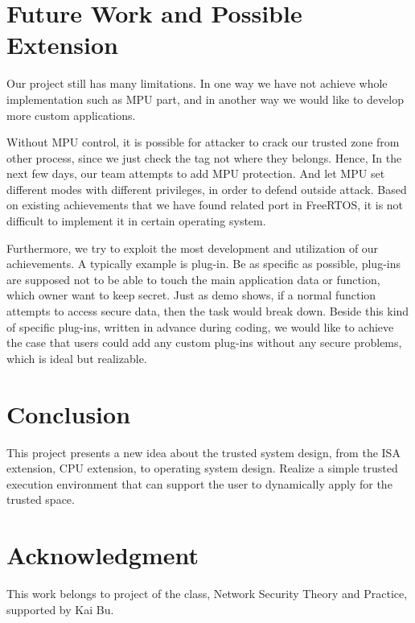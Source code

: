 \documentclass[conference]{IEEEtran}
\begin{document}

\section{Future Work and Possible Extension}
Our project still has many limitations. In one way we have not achieve whole implementation such as MPU part, and in another way we would like to develop more custom applications. 

Without MPU control, it is possible for attacker to crack our trusted zone from other process, since we just check the tag not where they belongs. Hence, In the next few days, our team attempts to add MPU protection. And let MPU set different modes with different privileges, in order to defend outside attack. Based on existing achievements that we have found related port in FreeRTOS, it is not difficult to implement it in certain operating system.


Furthermore, we try to exploit the most development and utilization of our achievements. A typically example is plug-in. Be as specific as possible, plug-ins are supposed not to be able to touch the main application data or function, which owner want to keep secret. Just as demo shows, if a normal function attempts to access secure data, then the task would break down. Beside this kind of specific plug-ins, written in advance during coding, we would like to achieve the case that users could add any custom plug-ins without any secure problems, which is ideal but realizable.



\section{Conclusion}
This project presents a new idea about the trusted system design, from the ISA extension, CPU extension, to operating system design. Realize a simple trusted execution environment that can support the user to dynamically apply for the trusted space.


\section*{Acknowledgment}
This work belongs to project of the class, Network Security Theory and Practice, supported by Kai Bu.
\end{document}
